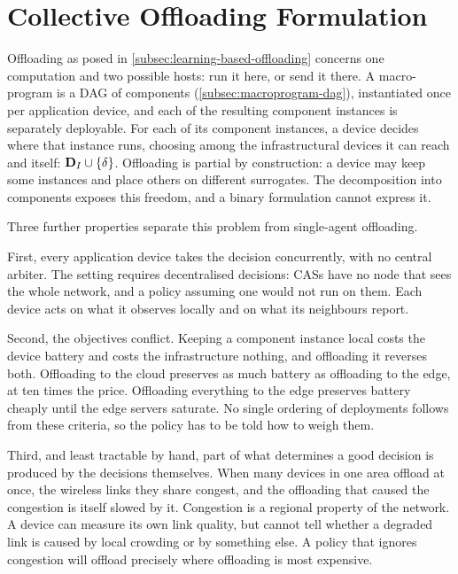 \section{Collective Offloading Formulation}
\label{sec:collective-offloading-learning}

Offloading as posed in \cref{subsec:learning-based-offloading} concerns one computation and two possible hosts:
run it here, or send it there.
%
A macro-program is a \ac{DAG} of components (\cref{subsec:macroprogram-dag}),
instantiated once per application device,
and each of the resulting component instances is separately deployable.
%
For each of its component instances, a device decides where that instance runs,
choosing among the infrastructural devices it can reach and itself:
$\mathbf{D}_{I} \cup \{\delta\}$.
%
Offloading is partial by construction: a device may keep some instances and place others on different surrogates.
The decomposition into components exposes this freedom, and a binary formulation cannot express it.

Three further properties separate this problem from single-agent offloading.

First, every application device takes the decision concurrently, with no central arbiter.
%
The setting requires decentralised decisions:
\acp{CAS} have no node that sees the whole network,
and a policy assuming one would not run on them.
%
Each device acts on what it observes locally and on what its neighbours report.

Second, the objectives conflict.
%
Keeping a component instance local costs the device battery and costs the infrastructure nothing, and offloading it reverses both.
%
Offloading to the cloud preserves as much battery as offloading to the edge, at ten times the price.
Offloading everything to the edge preserves battery cheaply until the edge servers saturate.
%
No single ordering of deployments follows from these criteria,
so the policy has to be told how to weigh them.

Third, and least tractable by hand,
part of what determines a good decision is produced by the decisions themselves.
%
When many devices in one area offload at once,
the wireless links they share congest,
and the offloading that caused the congestion is itself slowed by it.
%
Congestion is a regional property of the network.
A device can measure its own link quality, but cannot tell whether a degraded link is caused by local crowding or by something else.
%
A policy that ignores congestion will offload precisely where offloading is most expensive.

